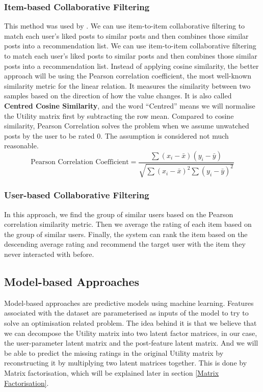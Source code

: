 \subsubsection{Item-based Collaborative Filtering}
This method was used by \cite{ItemBasedCollaborativeFilteringRecommendationAlgorithms}. We can use item-to-item collaborative filtering to match each user’s liked posts to similar posts and then combines those similar posts into a recommendation list.
We can use item-to-item collaborative filtering to match each user’s liked posts to similar posts and then combines those similar posts into a recommendation list.
Instead of applying cosine similarity, the better approach will be using the Pearson correlation coefficient, the most well-known similarity metric for the linear relation. It measures the similarity between two samples based on the direction of how the value changes. It is also called \textbf{Centred Cosine Similarity}, and the word “Centred” means we will normalise the Utility matrix first by subtracting the row mean. Compared to cosine similarity, Pearson Correlation solves the problem when we assume unwatched posts by the user to be rated 0. The assumption is considered not much reasonable.
\begin{equation*}
\text{Pearson Correlation Coefficient} = \frac{\sum(x_{i} - \bar{x})(y_{i} - \bar{y})} {\sqrt{\sum(x_{i} - \bar{x})^{2} \sum{(y_{i} - \bar{y})^{2} }}}
\end{equation*}


\subsubsection{User-based Collaborative Filtering}
In this approach, we find the group of similar users based on the Pearson correlation similarity metric. Then we average the rating of each item based on the group of similar users. Finally, the system can rank the item based on the descending average rating and recommend the target user with the item they never interacted with before.

\subsection{Model-based Approaches}
Model-based approaches are predictive models using machine learning. Features associated with the dataset are parameterised as inputs of the model to try to solve an optimisation related problem. The idea behind it is that we believe that we can decompose the Utility matrix into two latent factor matrices, in our case, the user-parameter latent matrix and the post-feature latent matrix. And we will be able to predict the missing ratings in the original Utility matrix by reconstructing it by multiplying two latent matrices together. This is done by Matrix factorisation, which will be explained later in section \ref{Matrix Factorisation}.
